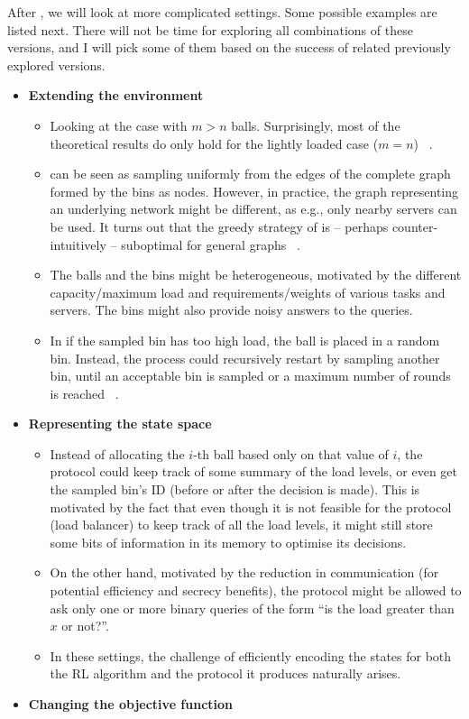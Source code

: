 After \TwoThinning, we will look at more complicated settings. Some possible examples are listed next. There will not be time for exploring all combinations of these versions, and I will pick some of them based on the success of related previously explored versions.
\begin{itemize}
    \item
    \textbf{Extending the environment}
    \begin{itemize}
        \item
        Looking at the case with $m>n$ balls. Surprisingly, most of the theoretical results do only hold for the lightly loaded case ($m=n$) ~\cite{berenbrink2006heavilyloaded}.
        \item
        \TwoChoice can be seen as sampling uniformly from the edges of the complete graph formed by the bins as nodes. However, in practice, the graph representing an underlying network might be different, as e.g., only nearby servers can be used. It turns out that the greedy strategy of \TwoChoice is -- perhaps counter-intuitively -- suboptimal for general graphs ~\cite{bansal2021twochoicegraphical}.
        \item
        The balls and the bins might be heterogeneous, motivated by the different capacity/maximum load and requirements/weights of various tasks and servers. The bins might also provide noisy answers to the queries.
        \item
        In \TwoThinning if the sampled bin has too high load, the ball is placed in a random bin. Instead, the process could recursively restart by sampling another bin, until an acceptable bin is sampled or a maximum number of rounds is reached ~\cite{czumaj1997randomized}.
    \end{itemize}
    
    \item
    \textbf{Representing the state space}
    
    \begin{itemize}
        \item
        Instead of allocating the $i$-th ball based only on that value of $i$, the protocol could keep track of some summary of the load levels, or even get the sampled bin's ID (before or after the decision is made). This is motivated by the fact that even though it is not feasible for the protocol (load balancer) to keep track of all the load levels, it might still store some bits of information in its memory to optimise its decisions.
        \item
        On the other hand, motivated by the reduction in communication (for potential efficiency and secrecy benefits), the protocol might be allowed to ask only one or more binary queries of the form ``is the load greater than $x$ or not?''.
        \item
        In these settings, the challenge of efficiently encoding the states for both the RL algorithm and the protocol it produces naturally arises.
    \end{itemize}
    \item
    \textbf{Changing the objective function}
    

\end{itemize}
